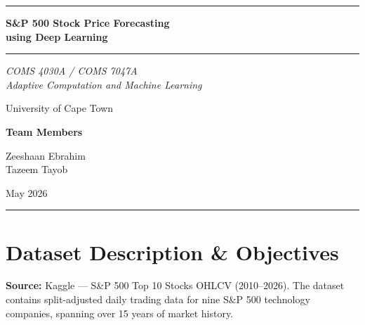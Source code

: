 \documentclass[12pt, a4paper]{article}
\begin{document}
\thispagestyle{plain}

\begin{titlepage}
  \centering
  \vspace*{3cm}

  {\color{uctnavy}\rule{\linewidth}{1.5pt}}
  \vspace{0.6cm}

  {\color{uctnavy}\LARGE\bfseries
    S\&P 500 Stock Price Forecasting\\[6pt]
    using Deep Learning\par}

  \vspace{0.5cm}
  {\color{uctnavy}\rule{\linewidth}{0.5pt}}
  \vspace{1.2cm}

  {\large\itshape
    COMS 4030A / COMS 7047A\\[4pt]
    Adaptive Computation and Machine Learning\par}

  \vspace{0.5cm}
  {\large University of Cape Town\par}

  \vspace{2.5cm}

  {\normalsize\bfseries\color{uctnavy} Team Members\par}
  \vspace{0.4cm}
  {\large
    Zeeshaan Ebrahim \\[6pt]
    Tazeem Tayob \par}

  \vfill
  {\large May 2026\par}
  \vspace{1cm}
  {\color{uctnavy}\rule{\linewidth}{1.5pt}}
\end{titlepage}

\newpage
\tableofcontents
\newpage

\section{Dataset Description \& Objectives}

\textbf{Source:} Kaggle --- S\&P 500 Top 10 Stocks OHLCV (2010--2026). The dataset contains split-adjusted daily trading data for nine S\&P 500 technology companies, spanning over 15 years of market history.
\end{document}
